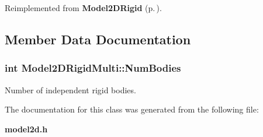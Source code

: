 Reimplemented from {\bf Model2DRigid} {\rm (p.\,\pageref{class_Model2DRigid_a6})}.

\subsection{Member Data Documentation}
\subsubsection{\setlength{\rightskip}{0pt plus 5cm}int Model2DRigid\-Multi::Num\-Bodies}\label{class_Model2DRigidMulti_m0}


Number of independent rigid bodies.



The documentation for this class was generated from the following file:\begin{CompactItemize}
\item 
{\bf model2d.h}\end{CompactItemize}
